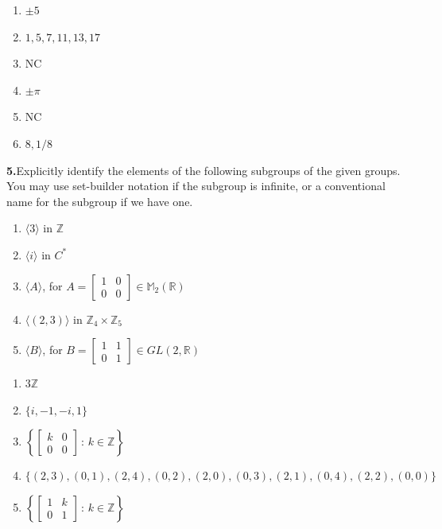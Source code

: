 \documentclass[10pt,]{book}
\theoremstyle{plain}
\theoremstyle{definition}
\theoremstyle{definition}
\theoremstyle{definition}
\theoremstyle{definition}
\numberwithin{equation}{section}
\def\Z{\mathbb{Z}}
\def\R{\mathbb{R}}
\def\M{\mathbb{M}}
\newcommand{\amp}{&}
\begin{document}
%
\par\smallskip
\leavevmode%
\begin{enumerate}[label=(\alph*)]
\item\hypertarget{li-239}{}\(\pm 5\)%
\item\hypertarget{li-240}{}\(1,5,7,11,13,17\)%
\item\hypertarget{li-241}{}NC%
\item\hypertarget{li-242}{}\(\pm \pi\)%
\item\hypertarget{li-243}{}NC%
\item\hypertarget{li-244}{}\(8,1/8\)%
\end{enumerate}
\par\smallskip
\noindent\textbf{5.}\quad{}Explicitly identify the elements of the following subgroups of the given groups. You may use set-builder notation if the subgroup is infinite, or a conventional name for the subgroup if we have one. \leavevmode%
\begin{enumerate}[label=(\alph*)]
\item\hypertarget{li-245}{}\(\langle 3\rangle\) in \(\Z\)%
\item\hypertarget{li-246}{}\(\langle i\rangle\) in \(C^*\)%
\item\hypertarget{li-247}{}\(\langle A\rangle\), for \(A=\left[ \begin{array}{cc}
1 \amp  0 \\
0 \amp  0
\end{array} 
\right]\in \M_2(\R)\)%
\item\hypertarget{li-248}{}\(\langle (2,3)\rangle\) in \(\Z_4\times \Z_5\)%
\item\hypertarget{li-249}{}\(\langle B\rangle\), for \(B=\left[ \begin{array}{cc}
1 \amp  1\\
0 \amp  1
\end{array} 
\right]\in GL(2,\R)\)%
\end{enumerate}
%
\par\smallskip
\leavevmode%
\begin{enumerate}[label=(\alph*)]
\item\hypertarget{li-250}{}\(3\Z\)%
\item\hypertarget{li-251}{}\(\{i,-1,-i,1\}\)%
\item\hypertarget{li-252}{}\(\left\{\left[
\begin{array}{cc}
k \amp  0 \\
0 \amp  0
\end{array} 
\right]\,:\,k\in \Z
\right\}\)%
\item\hypertarget{li-253}{}\(\{(2,3),(0,1),(2,4),(0,2),(2,0),(0,3),(2,1),(0,4),(2,2),(0,0)\}\)%
\item\hypertarget{li-254}{}\(\left\{\left[
\begin{array}{cc}
1 \amp  k \\
0 \amp  1
\end{array} 
\right]\,:\,k\in \Z\right\}\)%
\end{enumerate}
\end{document}
